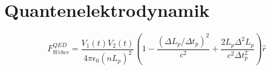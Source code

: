 \section{Quantenelektrodynamik}
\[ F_{Weber}^{QED} = \frac{V_1(t) V_2(t)}{4\pi\epsilon_0 (nL_p)^2} \left(1 - \frac{(\Delta L_p / \Delta t_p)^2}{c^2} + \frac{2 L_p \Delta^2 L_p}{c^2 \Delta t_p^2}\right)\hat{r} \]